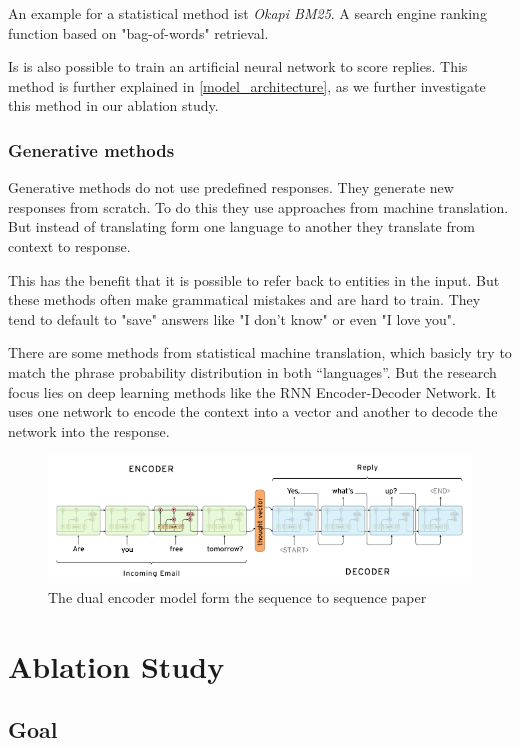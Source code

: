 \documentclass[conference]{IEEEtran}
\begin{document}
An example for a statistical method ist \emph{Okapi BM25}\cite{manning2008introduction}. A search engine ranking function based on "bag-of-words" retrieval.

Is is also possible to train an artificial neural network to score replies\cite{yan2016shall,kadlec2015improved}. This method is further explained in \autoref{model_architecture}, as we further investigate this method in our ablation study.

\subsubsection{Generative methods}
Generative methods do not use predefined responses. They generate new responses from scratch. To do this they use approaches from machine translation. But instead of translating form one language to another they translate from context to response.

This has the benefit that it is possible to refer back to entities in the input. But these methods often make grammatical mistakes and are hard to train. They tend to default to "save" answers like "I don't know" or even "I love you".\

There are some methods from statistical machine translation, which basicly try to match the phrase probability distribution in both “languages”. But the research focus lies on deep learning methods like the RNN Encoder-Decoder Network\cite{sutskever2014sequence}. It uses one network to encode the context into a vector and another to decode the network into the response.

\begin{figure}[H]
\centering
   \includegraphics[width=\linewidth]{sequence_to_sequence.png}
  \caption{The dual encoder model form the sequence to sequence paper\cite{sutskever2014sequence}}
\end{figure}

\section{Ablation Study}
\subsection{Goal}
\end{document}

